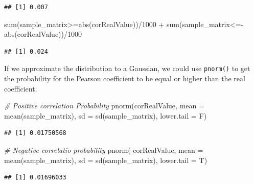 \documentclass[
  notitlepage,
  onecolumn,
  openany]{book}
\newenvironment{Shaded}{\begin{snugshade}}{\end{snugshade}}
\newcommand{\AttributeTok}[1]{\textcolor[rgb]{0.77,0.63,0.00}{#1}}
\newcommand{\CommentTok}[1]{\textcolor[rgb]{0.56,0.35,0.01}{\textit{#1}}}
\newcommand{\DecValTok}[1]{\textcolor[rgb]{0.00,0.00,0.81}{#1}}
\newcommand{\FunctionTok}[1]{\textcolor[rgb]{0.00,0.00,0.00}{#1}}
\newcommand{\NormalTok}[1]{#1}
\newcommand{\SpecialCharTok}[1]{\textcolor[rgb]{0.00,0.00,0.00}{#1}}
\begin{document}
\begin{verbatim}
## [1] 0.007
\end{verbatim}

\begin{Shaded}
\begin{Highlighting}[]
\FunctionTok{sum}\NormalTok{(sample\_matrix}\SpecialCharTok{\textgreater{}=}\FunctionTok{abs}\NormalTok{(corRealValue))}\SpecialCharTok{/}\DecValTok{1000} \SpecialCharTok{+} \FunctionTok{sum}\NormalTok{(sample\_matrix}\SpecialCharTok{\textless{}={-}}\FunctionTok{abs}\NormalTok{(corRealValue))}\SpecialCharTok{/}\DecValTok{1000}
\end{Highlighting}
\end{Shaded}

\begin{verbatim}
## [1] 0.024
\end{verbatim}

If we approximate the distribution to a Gaussian, we could use \texttt{pnorm()} to get the probability for the Pearson coefficient to be equal or higher than the real coefficient.

\begin{Shaded}
\begin{Highlighting}[]
\CommentTok{\# Positive correlation Probability}
\FunctionTok{pnorm}\NormalTok{(corRealValue, }\AttributeTok{mean =} \FunctionTok{mean}\NormalTok{(sample\_matrix), }\AttributeTok{sd =} \FunctionTok{sd}\NormalTok{(sample\_matrix), }\AttributeTok{lower.tail =}\NormalTok{ F)}
\end{Highlighting}
\end{Shaded}

\begin{verbatim}
## [1] 0.01750568
\end{verbatim}

\begin{Shaded}
\begin{Highlighting}[]
\CommentTok{\# Negative correlatio probability}
\FunctionTok{pnorm}\NormalTok{(}\SpecialCharTok{{-}}\NormalTok{corRealValue, }\AttributeTok{mean =} \FunctionTok{mean}\NormalTok{(sample\_matrix), }\AttributeTok{sd =} \FunctionTok{sd}\NormalTok{(sample\_matrix), }\AttributeTok{lower.tail =}\NormalTok{ T)}
\end{Highlighting}
\end{Shaded}

\begin{verbatim}
## [1] 0.01696033
\end{verbatim}
\end{document}
